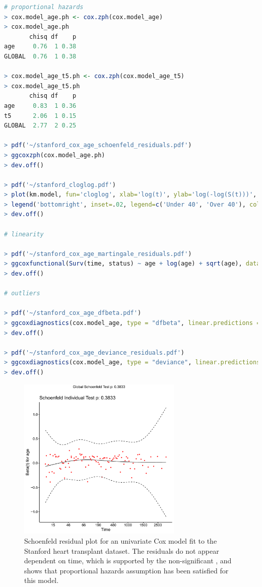 \begin{lstlisting}[language=R]
# proportional hazards
> cox.model_age.ph <- cox.zph(cox.model_age)
> cox.model_age.ph
       chisq df    p
age     0.76  1 0.38
GLOBAL  0.76  1 0.38

> cox.model_age_t5.ph <- cox.zph(cox.model_age_t5)
> cox.model_age_t5.ph
       chisq df    p
age     0.83  1 0.36
t5      2.06  1 0.15
GLOBAL  2.77  2 0.25

> pdf('~/stanford_cox_age_schoenfeld_residuals.pdf')
> ggcoxzph(cox.model_age.ph)
> dev.off()

> pdf('~/stanford_cloglog.pdf')
> plot(km.model, fun='cloglog', xlab='log(t)', ylab='log(-log(S(t)))', col=c('#4e79a7', '#f28e2b'))
> legend('bottomright', inset=.02, legend=c('Under 40', 'Over 40'), col=c('#4e79a7', '#f28e2b'), lty=1:2, box.lty=0)
> dev.off()

# linearity

> pdf('~/stanford_cox_age_martingale_residuals.pdf')
> ggcoxfunctional(Surv(time, status) ~ age + log(age) + sqrt(age), data = df)
> dev.off()

# outliers

> pdf('~/stanford_cox_age_dfbeta.pdf')
> ggcoxdiagnostics(cox.model_age, type = "dfbeta", linear.predictions = FALSE)
> dev.off()

> pdf('~/stanford_cox_age_deviance_residuals.pdf')
> ggcoxdiagnostics(cox.model_age, type = "deviance", linear.predictions = FALSE)
> dev.off()
\end{lstlisting}

\begin{figure}[H]
\centering
\includegraphics[width=0.7\textwidth]{figures/survival/stanford_cox_age_schoenfeld_residuals}
\vspace{0.2cm}
\caption{
Schoenfeld residual plot for
an univariate Cox model fit to the Stanford heart transplant dataset.
The residuals do not appear dependent on time,
which is supported by the non-significant \pvalue,
and shows that proportional hazards assumption
has been satisfied for this model.
}
\label{fig:cox:schoenfeld_residuals}
\end{figure}

